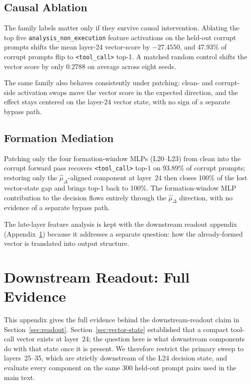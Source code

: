 \subsection{Causal Ablation}
The family labels matter only if they survive causal intervention.
Ablating the top five \texttt{analysis\_non\_execution} feature activations on the
held-out corrupt prompts shifts the mean layer-24 vector-score by $-27.4550$,
and 47.93\% of corrupt prompts flip to \texttt{<tool\_call>} top-1.
A matched random control shifts the vector score by only $0.2788$ on average
across eight seeds.

The same family also behaves consistently under patching: clean- and corrupt-side
activation swaps move the vector score in the expected direction, and the effect
stays centered on the layer-24 vector state, with no sign of a separate bypass path.

\subsection{Formation Mediation}
Patching only the four formation-window MLPs (L20--L23) from clean into the
corrupt forward pass recovers \texttt{<tool\_call>} top-1 on 93.89\% of corrupt
prompts; restoring only the $\hat{\mu}_\Delta$-aligned component at layer~24
then closes 100\% of the lost vector-state gap and brings top-1 back to 100\%.
The formation-window MLP contribution to the decision flows entirely through the
$\hat{\mu}_\Delta$ direction, with no evidence of a separate bypass path.

The late-layer feature analysis is kept with the downstream readout appendix
(Appendix~\ref{appendix:readout}) because it addresses a separate question:
how the already-formed vector is translated into output structure.

\section{Downstream Readout: Full Evidence}
\label{appendix:readout}
This appendix gives the full evidence behind the downstream-readout claim in
Section~\ref{sec:readout}. Section~\ref{sec:vector-state} established that a
compact tool-call vector exists at layer~24; the question here is what
downstream components do with that state once it is present.  We therefore restrict the primary sweep to layers~25--35, which are
strictly downstream of the L24 decision state, and evaluate every component on
the same 300 held-out prompt pairs used in the main text.

